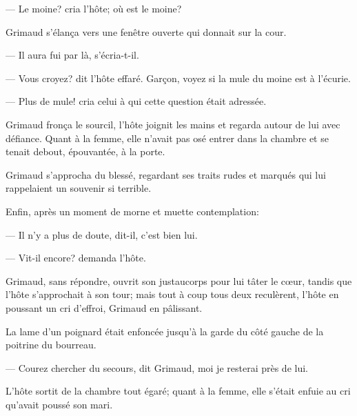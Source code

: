 — Le moine? cria l'hôte; où est le moine?

Grimaud s'élança vers une fenêtre ouverte qui donnait sur la cour.

— Il aura fui par là, s'écria-t-il.

— Vous croyez? dit l'hôte effaré. Garçon, voyez si la mule du moine est à l'écurie.

— Plus de mule! cria celui à qui cette question était adressée.

Grimaud fronça le sourcil, l'hôte joignit les mains et regarda autour de lui avec défiance. Quant à la femme, elle n'avait pas osé entrer dans la chambre et se tenait debout, épouvantée, à la porte.

Grimaud s'approcha du blessé, regardant ses traits rudes et marqués qui lui rappelaient un souvenir si terrible.

Enfin, après un moment de morne et muette contemplation:

— Il n'y a plus de doute, dit-il, c'est bien lui.

— Vit-il encore? demanda l'hôte.

Grimaud, sans répondre, ouvrit son justaucorps pour lui tâter le cœur, tandis que l'hôte s'approchait à son tour; mais tout à coup tous deux reculèrent, l'hôte en poussant un cri d'effroi, Grimaud en pâlissant.

La lame d'un poignard était enfoncée jusqu'à la garde du côté gauche de la poitrine du bourreau.

— Courez chercher du secours, dit Grimaud, moi je resterai près de lui.

L'hôte sortit de la chambre tout égaré; quant à la femme, elle s'était enfuie au cri qu'avait poussé son mari.